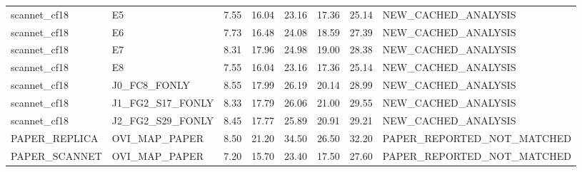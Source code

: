 \begin{tabular}{llllllll}
scannet\_cf18 & E5 & 7.55 & 16.04 & 23.16 & 17.36 & 25.14 & NEW\_CACHED\_ANALYSIS \\
scannet\_cf18 & E6 & 7.73 & 16.48 & 24.08 & 18.59 & 27.39 & NEW\_CACHED\_ANALYSIS \\
scannet\_cf18 & E7 & 8.31 & 17.96 & 24.98 & 19.00 & 28.38 & NEW\_CACHED\_ANALYSIS \\
scannet\_cf18 & E8 & 7.55 & 16.04 & 23.16 & 17.36 & 25.14 & NEW\_CACHED\_ANALYSIS \\
scannet\_cf18 & J0\_FC8\_FONLY & 8.55 & 17.99 & 26.19 & 20.14 & 28.99 & NEW\_CACHED\_ANALYSIS \\
scannet\_cf18 & J1\_FG2\_S17\_FONLY & 8.33 & 17.79 & 26.06 & 21.00 & 29.55 & NEW\_CACHED\_ANALYSIS \\
scannet\_cf18 & J2\_FG2\_S29\_FONLY & 8.45 & 17.77 & 25.89 & 20.91 & 29.21 & NEW\_CACHED\_ANALYSIS \\
PAPER\_REPLICA & OVI\_MAP\_PAPER & 8.50 & 21.20 & 34.50 & 26.50 & 32.20 & PAPER\_REPORTED\_NOT\_MATCHED \\
PAPER\_SCANNET & OVI\_MAP\_PAPER & 7.20 & 15.70 & 23.40 & 17.50 & 27.60 & PAPER\_REPORTED\_NOT\_MATCHED \\
\bottomrule
\end{tabular}
